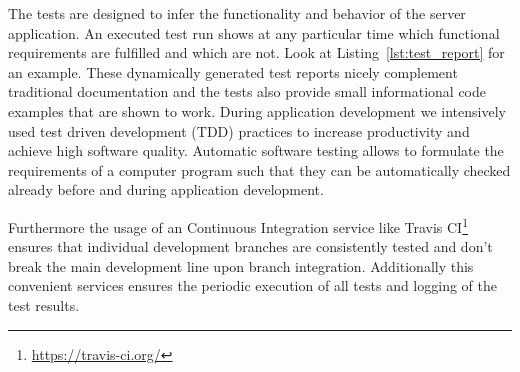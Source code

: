 The tests are designed to infer the functionality and behavior of the server application.
An executed test run shows at any particular time which functional requirements are fulfilled and which are not.
Look at Listing~\ref{lst:test_report} for an example.
These dynamically generated test reports nicely complement traditional documentation and the tests also provide small informational code examples that are shown to work.
During application development we intensively used test driven development (TDD) practices to increase productivity and achieve high software quality.
Automatic software testing allows to formulate the requirements of a computer program such that they can be automatically checked already before and during application development.



Furthermore the usage of an Continuous Integration service like Travis CI\footnote{\url{https://travis-ci.org/}} ensures that individual development branches are consistently tested and don't break the main development line upon branch integration.
Additionally this convenient services ensures the periodic execution of all tests and logging of the test results.
